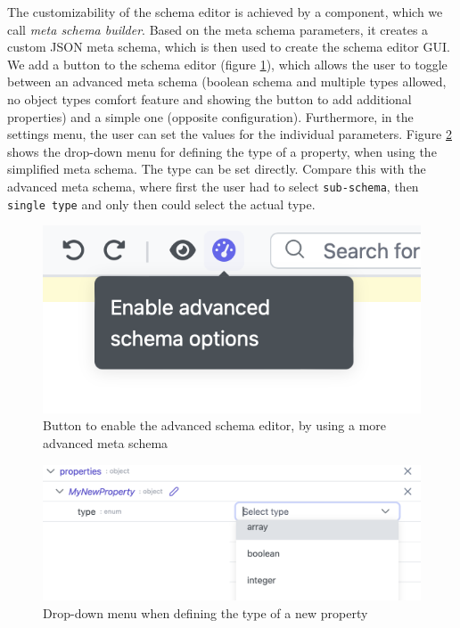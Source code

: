 The customizability of the schema editor is achieved by a component, which we call \textit{meta schema builder}.
Based on the meta schema parameters, it creates a custom JSON meta schema, which is then used to create the schema editor GUI.
We add a button to the schema editor (figure \ref{fig:schema_editor_advanced_mode_button}), which allows the user to toggle between an advanced meta schema (boolean schema and multiple types allowed, no object types comfort feature and showing the button to add additional properties) and a simple one (opposite configuration).
Furthermore, in the settings menu, the user can set the values for the individual parameters.
Figure \ref{fig:schema_editor_simple_choose_type} shows the drop-down menu for defining the type of a property, when using the simplified meta schema.
The type can be set directly.
Compare this with the advanced meta schema, where first the user had to select \texttt{sub-schema}, then \texttt{single type} and only then could select the actual type.

\begin{figure}[!t]
    \centering
    \includegraphics[width=0.5\columnwidth]{figures/schema_editor_advanced_mode_button}
    \caption{Button to enable the advanced schema editor, by using a more advanced meta schema}
    \label{fig:schema_editor_advanced_mode_button}
\end{figure}

\begin{figure}[!t]
    \centering
    \includegraphics[width=\columnwidth]{figures/schema_editor_simple_choose_type}
    \caption{Drop-down menu when defining the type of a new property}
    \label{fig:schema_editor_simple_choose_type}
\end{figure}



